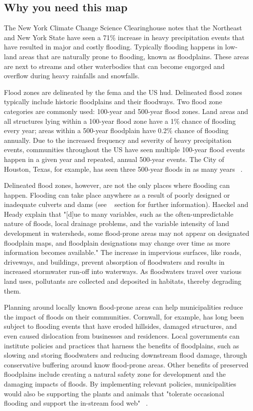 \subsection*{Why you need this map}
The New York Climate Change Science Clearinghouse notes that the Northeast and 
New York State have seen a 71\% increase in heavy precipitation events that 
have resulted in major and costly flooding. Typically flooding happens in 
low-land areas that are naturally prone to flooding, known as floodplains. These 
areas are next to streams and other waterbodies that can become engorged and 
overflow during heavy rainfalls and snowfalls.
\par
Flood zones are delineated by the \gls{fema} and the US \gls{hud}. Delineated 
flood zones typically include historic floodplains and their floodways. Two 
flood zone categories are commonly used: 100-year and 500-year flood zones. 
Land areas and all structures lying within a 100-year flood zone have a 1\% 
chance of flooding every year; areas within a 500-year floodplain have 0.2\% 
chance of flooding annually. Due to the increased frequency and severity of 
heavy precipitation events, communities throughout the US have seen multiple 
100-year flood events happen in a given year and repeated, annual 500-year 
events. The City of Houston, Texas, for example, has seen three 500-year floods 
in as many years ~\citep{dara2017}.
\par
Delineated flood zones, however, are not the only places where flooding can 
happen. Flooding can take place anywhere as a result of poorly designed or 
inadequate culverts and dams (see ~ section for 
further information). Haeckel and Heady explain that "[d]ue to many variables, 
such as the often-unpredictable nature of floods, local drainage problems, and 
the variable intensity of land development in watersheds, some flood-prone 
areas may not appear on designated floodplain maps, and floodplain designations 
may change over time as more information becomes available." The increase in 
impervious surfaces, like roads, driveways, and buildings, prevent absorption 
of floodwaters and results in increased stormwater run-off into waterways. As 
floodwaters travel over various land uses, pollutants are collected and 
deposited in habitats, thereby degrading them.
\par
Planning around locally known flood-prone areas can help municipalities reduce 
the impact of floods on their communities. Cornwall, for example, has long been 
subject to flooding events that have eroded hillsides, damaged structures, and 
even caused dislocation from businesses and residences. Local governments can 
institute policies and practices that harness the benefits of floodplains, such 
as slowing and storing floodwaters and reducing downstream flood damage, 
through conservative buffering around know flood-prone areas. Other benefits of 
preserved floodplains include creating a natural safety zone for development 
and the damaging impacts of floods. By implementing relevant policies, 
municipalities would also be supporting the plants and animals that "tolerate 
occasional flooding and support the in-stream food web" ~\citep{haeckel2014}.

